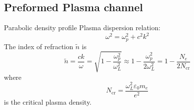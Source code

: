 \documentclass[dvipsnames]{beamer}
\begin{document}
\subsection{Preformed Plasma channel}
\begin{frame}{Parabolic density profile}
 Plasma dispersion relation:
 \begin{equation*}
\omega^2=\omega_p^2+c^2k^2
 \end{equation*}
 The index of refraction $\tilde n$ is
 \begin{equation*}
\tilde{n}=\frac{c k}{\omega}=\sqrt{1-\frac{\omega_p^2}{\omega_L^2}}\approx1-\frac{\omega_p^2}{2\omega_L^2}=1-\frac{N_e}{2N_\text{cr}}
 \end{equation*}
 {\small where
\begin{equation*}
 N_\text{cr}=\frac{\omega_L^2\varepsilon_0 m_e}{e^2}
\end{equation*}
is the critical plasma density.}
\end{frame}
%
\end{document}

